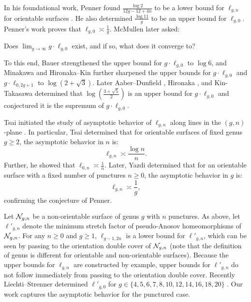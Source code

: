  In his foundational work, Penner found $\frac{\log 2}{12g-12+4n}$ to be a lower bound for $\ell_{g,n}$ for orientable surfaces \cite{penner1991bounds}.  He also determined $\frac{\log 11}{g}$ to be an upper bound for $\ell_{g,0}$.  Penner's work proves that $\ell_{g,0}\asymp \frac{1}{g}$.  McMullen  \cite{mcmullen2000polynomial} later asked:
\begin{question}[McMullen]
Does $\displaystyle\lim_{g\rightarrow\infty}g\cdot \ell_{g,0}$ exist, and if so, what does it converge to?
\end{question}
To this end, Bauer \cite{bauer} strengthened the upper bound for $g\cdot \ell_{g,0}$ to $\log 6$, and Minakawa \cite{minakawa} and Hironaka--Kin \cite{HK} further sharpened the upper bounds for $g\cdot \ell_{g,0}$ and $g\cdot \ell_{0,2g+1}$ to $\log(2+\sqrt{3})$.  Later Aaber--Dunfield \cite{AD}, Hironaka \cite{hironaka}, and Kin-Takasawa \cite{KTbounds} determined that $\log\left(\frac{3+\sqrt{5}}{2}\right)$ is an upper bound for $g\cdot \ell_{g,0}$ and conjectured it is the supremum of $g\cdot \ell_{g,0}$.

Tsai initiated the study of asymptotic behavior of $\ell_{g,n}$ along lines in the $(g,n)$-plane \cite{tsai2009asymptotic}.  In particular, Tsai determined that for orientable surfaces of fixed genus $g\geq 2$, the asymptotic behavior in $n$ is:
$$\ell_{g,n}\asymp \frac{\log n}{n}.$$
Further, he showed that $\ell_{0,n}\asymp \frac{1}{n}.$
Later, Yazdi \cite{yazdi2018pseudo} determined that for an orientable surface with a fixed number of punctures $n\geq 0$, the asymptotic behavior in $g$ is:
$$\ell_{g,n}\asymp \frac{1}{g},$$
confirming the conjecture of Penner.

Let $\mathcal{N}_{g,n}$ be a non-orientable surface of genus $g$ with $n$ punctures.  As above, let $\ell'_{g,n}$ denote the minimum stretch factor of pseudo-Anosov homeomorphisms of $\mathcal{N}_{g,n}$.  For any $n\geq 0$ and $g\geq 1$, $\ell_{g-1,2n}$ is a lower bound for $\ell'_{g,n}$, which can be seen by passing to the orientation double cover of $\mathcal{N}_{g,n}$ (note that the definition of genus is different for orientable and non-orientable surfaces).  Because the upper bounds for $\ell_{g,n}$ are constructed by example, upper bounds for $\ell'_{g,n}$ do not follow immediately from passing to the orientation double cover.  Recently Liechti--Strenner determined $\ell'_{g,0}$ for $g\in\{4,5,6,7,8,10,12,14,16,18,20\}$ \cite{LS}.  Our work captures the asymptotic behavior for the punctured case.

